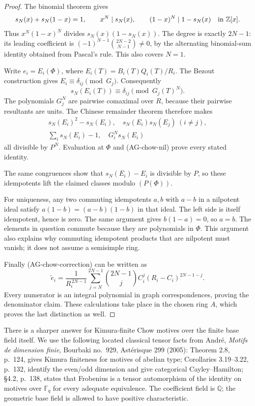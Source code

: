 \begin{proof}
The binomial theorem gives
\[
 s_N(x)+s_N(1-x)=1,\qquad
 x^N\mid s_N(x),\qquad (1-x)^N\mid1-s_N(x)
                         \quad\hbox{in }\mathbb Z[x].
\]
Thus $x^N(1-x)^N$ divides $s_N(x)(1-s_N(x))$.
The degree is exactly $2N-1$: its leading coefficient
is $(-1)^{N-1}{2N-2\choose N-1}\ne0$, by the
alternating binomial-sum identity obtained from
Pascal's rule.  This also covers $N=1$.

Write $e_i=E_i(\Phi)$, where
$E_i(T)=B_i(T)Q_i(T)/R_i$.  The Bezout construction
gives $E_i\equiv\delta_{ij}\pmod{G_j}$.
Consequently
\[
 s_N(E_i(T))\equiv\delta_{ij}\pmod{G_j(T)^N}.
\]
The polynomials $G_j^N$ are pairwise comaximal over
$R$, because their pairwise resultants are units.
The Chinese remainder theorem therefore makes
\[
 \begin{gathered}
 s_N(E_i)^2-s_N(E_i),\quad
 s_N(E_i)s_N(E_j)\ (i\ne j),\\
 \sum_i s_N(E_i)-1,
 \quad G_i^N s_N(E_i)
 \end{gathered}
\]
all divisible by $P^N$.  Evaluation at $\Phi$ and
(AG-chow-nil) prove every stated identity.

The same congruences show that $s_N(E_i)-E_i$ is
divisible by $P$, so these idempotents lift the
claimed classes modulo $(P(\Phi))$.

For uniqueness, any two commuting idempotents $a,b$
with $a-b$ in a nilpotent ideal satisfy
$a(1-b)=(a-b)(1-b)$ in that ideal.  The left side
is itself idempotent, hence is zero.  The same
argument gives $b(1-a)=0$, so $a=b$.
The elements in question commute because they are
polynomials in $\Phi$.  This argument also explains
why commuting idempotent products that are nilpotent
must vanish; it does not assume a semisimple ring.

Finally (AG-chow-correction) can be written as
\[
 \widetilde e_i=
 \frac{1}{R_i^{\,2N-1}}
 \sum_{j=N}^{2N-1}{2N-1\choose j}
                  C_i^j(R_i-C_i)^{2N-1-j}.
\]
Every numerator is an integral polynomial in graph
correspondences, proving the denominator claim.
These calculations take place in the chosen ring
$A$, which proves the last distinction as well.
\end{proof}

There is a sharper answer for Kimura-finite Chow motives
over the finite base field itself.  We use the following
located classical tensor facts from André,
\emph{Motifs de dimension finie}, Bourbaki no.~929,
Astérisque 299 (2005): Theorem 2.8, p.~124, gives
Kimura finiteness for motives of abelian type;
Corollaries 3.19--3.22, p.~132, identify the even/odd
dimension and give categorical Cayley--Hamilton;
\S4.2, p.~138, states that Frobenius is a tensor
automorphism of the identity on motives over
$\mathbb F_q$ for every adequate equivalence.
The coefficient field is $\mathbb Q$; the geometric
base field is allowed to have positive characteristic.

